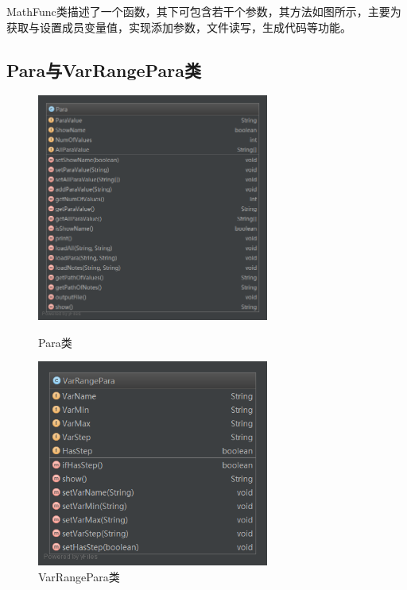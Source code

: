\documentclass[hyperref, UTF8
,bookmarksnumbered=true, oneside]{ctexbook}
\begin{document}
			MathFunc类描述了一个函数，其下可包含若干个参数，其方法如图所示，主要为获取与设置成员变量值，实现添加参数，文件读写，生成代码等功能。


		\subsection{Para与VarRangePara类} %
		\label{sub:para}


			\begin{figure}[!h]
				\begin{minipage}[b]{0.45\textwidth}
				\centering
				\includegraphics[width=3in]{Para.png}
				\caption{Para类}
				\label{pic:MathPack}
				\end{minipage}%
				\hspace{0.1\textwidth}%
				\begin{minipage}[b]{0.45\textwidth}
				\centering
				\includegraphics[width=3in]{VarRangePara.png}
				\caption{VarRangePara类}
				\label{pic:GUIPack}
				\end{minipage}
			\end{figure}
\end{document}

